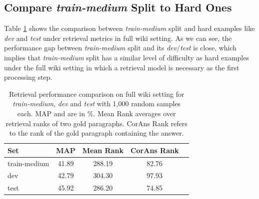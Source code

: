 \subsection{Compare \textit{train-medium} Split to Hard Ones}
Table \ref{tab:fullwiki_ir_train} shows the comparison between \textit{train-medium} split
and hard examples like \textit{dev} and \textit{test} under retrieval metrics in full wiki setting.
As we can see, the performance gap between \textit{train-medium} split and its
\textit{dev}/\textit{test} is close, which implies that \textit{train-medium} split has a similar level of
difficulty as hard examples under the full wiki setting in which a retrieval model is necessary as the first processing step.
\begin{table}[H]
    \small
    \centering
    \begin{tabular}{lcccc}
        \toprule
        Set & MAP & Mean Rank & CorAns Rank\\
        \midrule
        train-medium & 41.89 & 288.19 & 82.76 \\
        dev & 42.79 & 304.30 & 97.93  \\
        test & 45.92 & 286.20 & 74.85 \\
        \bottomrule
    \end{tabular}
    \caption{Retrieval performance comparison on full wiki setting for \textit{train-medium}, \textit{dev} and \textit{test} with 1,000 random samples each. MAP and are in \%. Mean Rank averages over retrieval ranks of two gold paragraphs. CorAns Rank refers to the rank of the gold paragraph containing the answer.} \label{tab:fullwiki_ir_train}
\end{table}
